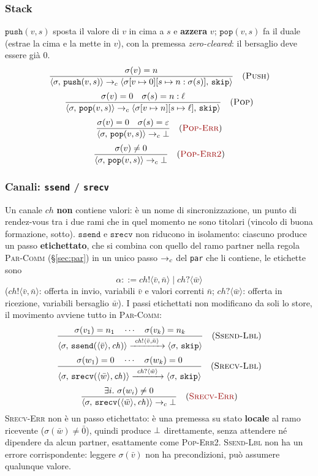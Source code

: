 \subsubsection{Stack}
\label{sec:stack}
$\mathtt{push}(v,s)$ sposta il valore di $v$ in cima a $s$ e \textbf{azzera} $v$;
$\mathtt{pop}(v,s)$ fa il duale (estrae la cima e la mette in $v$), con la
premessa \emph{zero-cleared}: il bersaglio deve essere già $0$.
\[
\dfrac{\sigma(v) = n}
      {\cfg{\mathtt{push}(v,s)}{\sigma} \toc \cfg{\mathtt{skip}}{\upd{\upd{\sigma}{v}{0}}{s}{n : \sigma(s)}}} \rname{Push}
\]
\[
\dfrac{\sigma(v) = 0 \quad \sigma(s) = n : \ell}
      {\cfg{\mathtt{pop}(v,s)}{\sigma} \toc \cfg{\mathtt{skip}}{\upd{\upd{\sigma}{v}{n}}{s}{\ell}}} \rname{Pop}
\]
\[
\dfrac{\sigma(v) = 0 \quad \sigma(s) = \varepsilon}
      {\cfg{\mathtt{pop}(v,s)}{\sigma} \toc \err} \rnameerr{Pop-Err}
\]
\[
\dfrac{\sigma(v) \neq 0}
      {\cfg{\mathtt{pop}(v,s)}{\sigma} \toc \err} \rnameerr{Pop-Err2}
\]

\subsubsection{Canali: \texttt{ssend} / \texttt{srecv}}
\label{sec:chan}
Un canale $\mathit{ch}$ \textbf{non} contiene valori: è un nome di
sincronizzazione, un punto di rendez-vous tra i due rami che in quel momento
ne sono titolari (vincolo di buona formazione, sotto). $\mathtt{ssend}$ e
$\mathtt{srecv}$ non riducono in isolamento: ciascuno produce un passo
\textbf{etichettato}, che si combina con quello del ramo partner nella
regola \textsc{Par-Comm} (\S\ref{sec:par}) in un unico passo $\toc$ del
\texttt{par} che li contiene, le etichette sono
\[
\alpha ::= \mathit{ch}!\langle \bar v,\bar n\rangle \mid \mathit{ch}?\langle \bar w\rangle
\]
($\mathit{ch}!\langle \bar v,\bar n\rangle$: offerta in invio, variabili
$\bar v$ e valori correnti $\bar n$; $\mathit{ch}?\langle \bar w\rangle$:
offerta in ricezione, variabili bersaglio $\bar w$). I passi etichettati non
modificano da soli lo store, il movimento avviene tutto in
\textsc{Par-Comm}:
\[
\dfrac{\sigma(v_1) = n_1 \quad \cdots \quad \sigma(v_k) = n_k}
      {\cfg{\mathtt{ssend}(\langle \bar v \rangle, \mathit{ch})}{\sigma}
       \xrightarrow{\ \mathit{ch}!\langle \bar v,\bar n\rangle\ } \cfg{\mathtt{skip}}{\sigma}} \rname{Ssend-Lbl}
\]
\[
\dfrac{\sigma(w_1) = 0 \quad \cdots \quad \sigma(w_k) = 0}
      {\cfg{\mathtt{srecv}(\langle \bar w \rangle, \mathit{ch})}{\sigma}
       \xrightarrow{\ \mathit{ch}?\langle \bar w\rangle\ } \cfg{\mathtt{skip}}{\sigma}} \rname{Srecv-Lbl}
\]
\[
\dfrac{\exists i.\ \sigma(w_i) \neq 0}
      {\cfg{\mathtt{srecv}(\langle \bar w \rangle, \mathit{ch})}{\sigma} \toc \err} \rnameerr{Srecv-Err}
\]
\textcolor{red!60!black}{\textsc{Srecv-Err}} non è un passo etichettato: è una premessa su stato
\textbf{locale} al ramo ricevente ($\sigma(\bar w) \neq \bar 0$), quindi
produce $\err$ direttamente, senza
attendere né dipendere da alcun partner, esattamente come
\textcolor{red!60!black}{\textsc{Pop-Err2}}. \textsc{Ssend-Lbl} non ha un errore corrispondente:
leggere $\sigma(\bar v)$ non ha precondizioni, può assumere qualunque valore.

